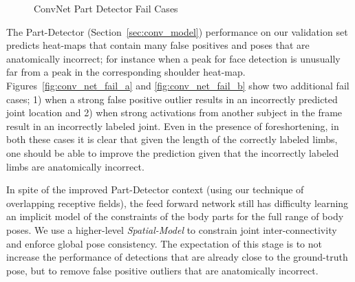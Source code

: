 \begin{figure}[ht]
\centering
        \caption{ConvNet Part Detector Fail Cases}
        \label{fig:conv_net_fail}
\end{figure}

The Part-Detector (Section~\ref{sec:conv_model}) performance on our validation set predicts heat-maps that contain many false positives and poses that are anatomically incorrect; for instance when a peak for face detection is unusually far from a peak in the corresponding shoulder heat-map. Figures~\ref{fig:conv_net_fail_a} and \ref{fig:conv_net_fail_b} show two additional fail cases; 1) when a strong false positive outlier results in an incorrectly predicted joint location and 2) when strong activations from another subject in the frame result in an incorrectly labeled joint. Even in the presence of foreshortening, in both these cases it is clear that given the length of the correctly labeled limbs, one should be able to improve the prediction given that the incorrectly labeled limbs are anatomically incorrect.

In spite of the improved Part-Detector context (using our technique of overlapping receptive fields), the feed forward network still has difficulty learning an implicit model of the constraints of the body parts for the full range of body poses. We use a higher-level \emph{Spatial-Model} to constrain joint inter-connectivity and enforce global pose consistency. The expectation of this stage is to not increase the performance of detections that are already close to the ground-truth pose, but to remove false positive outliers that are anatomically incorrect.

